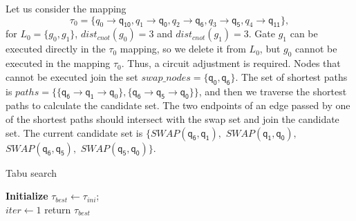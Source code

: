 \documentclass[runningheads]{llncs}
\begin{document}
\begin{example}
	Let us consider the mapping $$\tau_{0}=\{\textit{q}_\textit{0}\rightarrow  \textsf{q}_{\textsf{10}},\textit{q}_\textit{1}\rightarrow \textsf{q}_{\textsf{0}},
\textit{q}_\textit{2}\rightarrow  \textsf{q}_{\textsf{6}},\textit{q}_\textit{3}\rightarrow  \textsf{q}_{\textsf{5}},\textit{q}_\textit{4}\rightarrow  \textsf{q}_{\textsf{11}}\} , $$ 
for $L_{0}=\{g_{0},g_{1}\}$, $dist_{cnot}(g_{0})=3$ and $dist_{cnot}(g_{1})=3$. 
Gate $g_{1}$ can be executed directly in the $\tau_{0}$ mapping, so we delete it from $L_{0}$,
but $g_{0}$ cannot be executed in the mapping $\tau_{0}$.
Thus, a circuit adjustment is required. 
Nodes that cannot be executed join the set $swap\_nodes=\{\textsf{q}_{\textsf{0}},\textsf{q}_\textsf{6}\}$.
The set of shortest paths is $paths=\{\{\textsf{q}_{\textsf{6}}\rightarrow \textsf{q}_{\textsf{1}} \rightarrow \textsf{q}_{0} \},\{\textsf{q}_\textsf{6}\rightarrow \textsf{q}_\textsf{5} \rightarrow \textsf{q}_\textsf{0} \}\}$, 
and then we traverse the shortest paths to calculate the  candidate set.
The two endpoints of an edge passed by one of the shortest paths should intersect with the swap set and join the candidate set.
The current candidate set is $\{SWAP(\textsf{q}_\textsf{6},\textsf{q}_\textsf{1}),$ $SWAP(\textsf{q}_\textsf{1},\textsf{q}_\textsf{0}),$ $SWAP(\textsf{q}_\textsf{6},\textsf{q}_\textsf{5}),$ $SWAP(\textsf{q}_\textsf{5},\textsf{q}_\textsf{0}) \}$.
\end{example}

	\begin{algorithm} 
		\label{algorithm_Tabu}
			\caption{Tabu search }  
			\LinesNumbered  
			\textbf{Initialize}
				$\tau_{best}  \leftarrow \tau_{ini}$; \\
				$iter \leftarrow 1$  
			return $\tau_{best}$
	\end{algorithm}
        
\end{document}
